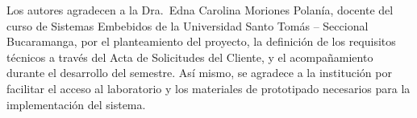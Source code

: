 Los autores agradecen a la Dra.\ Edna Carolina Moriones Polanía, docente del curso de Sistemas Embebidos de la Universidad Santo Tomás – Seccional Bucaramanga, por el planteamiento del proyecto, la definición de los requisitos técnicos a través del Acta de Solicitudes del Cliente, y el acompañamiento durante el desarrollo del semestre. Así mismo, se agradece a la institución por facilitar el acceso al laboratorio y los materiales de prototipado necesarios para la implementación del sistema.
